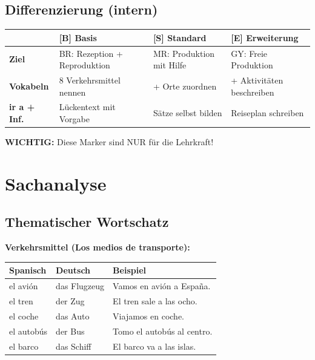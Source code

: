 \documentclass[11pt,a4paper]{article}
\newcommand{\B}{\textcolor{basis}{\textbf{[B]}}}
\newcommand{\Std}{\textcolor{standard}{\textbf{[S]}}}
\newcommand{\E}{\textcolor{erweiterung}{\textbf{[E]}}}
\begin{document}
\subsection{Differenzierung (intern)}
\begin{tabular}{|l|p{3.5cm}|p{3.5cm}|p{3.5cm}|}
\hline
& \B{} \textbf{Basis} & \Std{} \textbf{Standard} & \E{} \textbf{Erweiterung} \\
\hline
\textbf{Ziel} & BR: Rezeption + Reproduktion & MR: Produktion mit Hilfe & GY: Freie Produktion \\
\hline
\textbf{Vokabeln} & 8 Verkehrsmittel nennen & + Orte zuordnen & + Aktivitäten beschreiben \\
\hline
\textbf{ir a + Inf.} & Lückentext mit Vorgabe & Sätze selbst bilden & Reiseplan schreiben \\
\hline
\end{tabular}

\vspace{0.5em}
\textbf{WICHTIG:} Diese Marker sind NUR für die Lehrkraft!

\section{Sachanalyse}

\subsection{Thematischer Wortschatz}

\textbf{Verkehrsmittel (Los medios de transporte):}
\begin{center}
\begin{tabular}{|l|l|l|}
\hline
\textbf{Spanisch} & \textbf{Deutsch} & \textbf{Beispiel} \\
\hline
el avión & das Flugzeug & Vamos en avión a España. \\
el tren & der Zug & El tren sale a las ocho. \\
el coche & das Auto & Viajamos en coche. \\
el autobús & der Bus & Tomo el autobús al centro. \\
el barco & das Schiff & El barco va a las islas. \\
\hline
\end{tabular}
\end{center}
\end{document}

